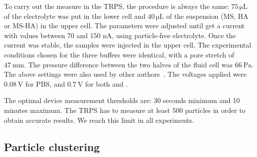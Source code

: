 \documentclass[journal=langd5,manuscript=article]{achemso}
\begin{document}
To carry out the measure in the TRPS, the procedure is always the same: $\mathrm{75 \,\mu L}$ of the electrolyte was put in the lower cell and $\mathrm{40 \,\mu L}$  of the suspension (MS, HA or MS-HA) in the upper cell. The parameters were adjusted until get a current with values between 70 and 150 nA, using particle-free electrolyte. Once the current was stable, the samples were injected in the upper cell. The experimental conditions chosen for the three buffers  were identical, with a pore stretch of $47~\mathrm{mm}$. The pressure difference between the two halves of the fluid cell was $66~\mathrm{Pa}$. The above settings were also used by other authors~\cite{Weatherall2016}. The voltages applied were  $0.08~\mathrm{V}$ for PBS, and  $0.7~\mathrm{V}$ for both  and . 
	



The optimal device measurement thresholds are: 30 seconds minimum and 10 minutes maximum. The TRPS has to measure at least 500 particles in order to obtain accurate results. We reach this limit in all experiments.
% 
% 











\subsection{Particle clustering}
\end{document}
